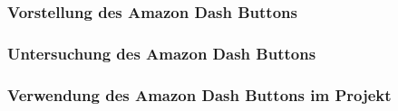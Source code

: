 \subsubsection{Vorstellung des Amazon Dash Buttons}        
\label{sec:Vorstellung des Amazon Dash Buttons} 

\subsubsection{Untersuchung des Amazon Dash Buttons}        
\label{sec:Untersuchung des Amazon Dash Buttons} 

\subsubsection{Verwendung des Amazon Dash Buttons im Projekt}        
\label{sec:Verwendung des Amazon Dash Buttons im Projekt} 
